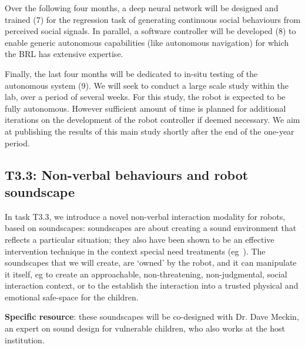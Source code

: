 \documentclass[11pt,a4paper]{report}
\begin{document}
Over the following four months, a deep neural network will be designed
and trained (7) for the regression task of generating continuous social
behaviours from perceived social signals. In parallel, a software
controller will be developed (8) to enable generic autonomous
capabilities (like autonomous navigation) for which the BRL has
extensive expertise.

Finally, the last four months will be dedicated to in-situ testing of
the autonomous system (9). We will seek to conduct a large scale study
within the lab, over a period of several weeks. For this study, the
robot is expected to be fully autonomous. However sufficient amount of
time is planned for additional iterations on the development of the
robot controller if deemed necessary. We aim at publishing the results
of this main study shortly after the end of the one-year period.


\subsection{T3.3: Non-verbal behaviours and robot soundscape}



In task T3.3, we
introduce a novel non-verbal interaction modality for robots, based on
soundscapes: soundscapes are about creating a sound environment that reflects a
particular situation; they also have been shown to be an effective intervention
technique in the context special need treatments
(eg~\cite{greher2010soundscape}). The soundscapes that we will create, are
`owned' by the robot, and it can manipulate it itself, eg to create an
approachable, non-threatening, non-judgmental, social interaction context, or to
the establish the interaction into a trusted physical and emotional safe-space
for the children.

\textbf{Specific resource}: these soundscapes will be co-designed with Dr.
Dave Meckin, an expert on sound design for vulnerable children, who also works
at the host institution.




\end{document}
